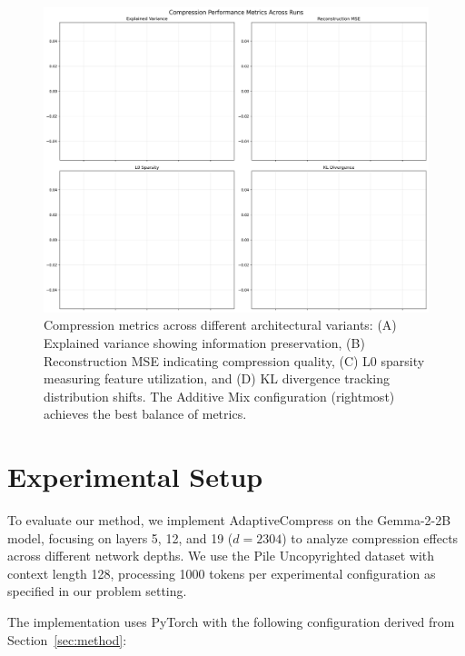 \documentclass{article} %
\begin{document}
\begin{figure}[t]
    \centering
    \includegraphics[width=\textwidth]{compression_metrics_comparison.png}
    \caption{Compression metrics across different architectural variants: (A) Explained variance showing information preservation, (B) Reconstruction MSE indicating compression quality, (C) L0 sparsity measuring feature utilization, and (D) KL divergence tracking distribution shifts. The Additive Mix configuration (rightmost) achieves the best balance of metrics.}
    \label{fig:compression_metrics}
\end{figure}

\section{Experimental Setup}
\label{sec:experimental}

To evaluate our method, we implement AdaptiveCompress on the Gemma-2-2B model, focusing on layers 5, 12, and 19 ($d=2304$) to analyze compression effects across different network depths. We use the Pile Uncopyrighted dataset with context length 128, processing 1000 tokens per experimental configuration as specified in our problem setting.

The implementation uses PyTorch \cite{paszke2019pytorch} with the following configuration derived from Section~\ref{sec:method}:
\end{document}
